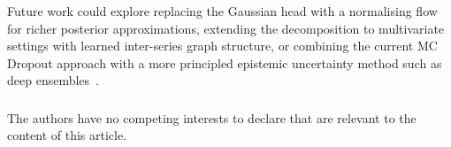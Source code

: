 \documentclass[runningheads]{llncs}
\begin{document}
Future work could explore replacing the Gaussian head with a normalising flow
for richer posterior approximations, extending the decomposition to multivariate
settings with learned inter-series graph structure, or combining the current
MC Dropout approach with a more principled epistemic uncertainty method such
as deep ensembles~\cite{lakshminarayanan2017}.

\begin{credits}
\subsubsection{\discintname}
The authors have no competing interests to declare that are relevant to the content
of this article.
\end{credits}
\end{document}
